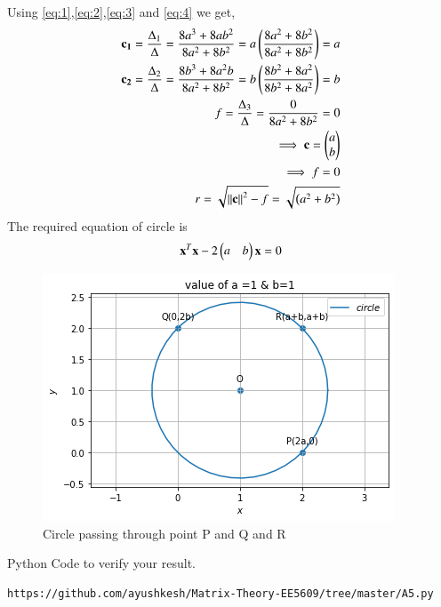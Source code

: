 \documentclass[journal,12pt,twocolumn]{IEEEtran}
\begin{document}
Using \eqref{eq:1},\eqref{eq:2},\eqref{eq:3} and \eqref{eq:4} we get,
\begin{align}
    \mathbf{c_1}= \frac{\Delta_{1}}{\Delta}= \frac{8a^3+8ab^2}{8a^2+8b^2}= a\left(\frac{8a^2+8b^2}{8a^2+8b^2}\right)= a\\
    \mathbf{c_2}= \frac{\Delta_{2}}{\Delta}= \frac{8b^3+8a^2b}{8a^2+8b^2}= b\left(\frac{8b^2+8a^2}{{8b^2+8a^2}}\right)= b\\
    f= \frac{\Delta_{3}}{\Delta}=\frac{0}{8a^2+8b^2}=0\\
    \implies \mathbf{c} = \begin{pmatrix}a\\b\end{pmatrix}\\
    \implies f = 0\\
    r=\sqrt{\left\lVert\mathbf{c}\right\rVert^2-f} = \sqrt{\left(a^2+b^2\right)}
\end{align}
The required equation of circle is 
\begin{align}
\mathbf{x}^T\mathbf{x}-2\begin{pmatrix}a&b\end{pmatrix}\mathbf{x} = 0
\end{align}
\begin{figure}[!ht]
\centering
\includegraphics[width=\columnwidth]{5.png}
\caption{Circle passing through point P and Q and R}
\label{Fig:5}
\end{figure}
Python Code to verify your result.
\begin{lstlisting}
https://github.com/ayushkesh/Matrix-Theory-EE5609/tree/master/A5.py
\end{lstlisting}
\end{document}
